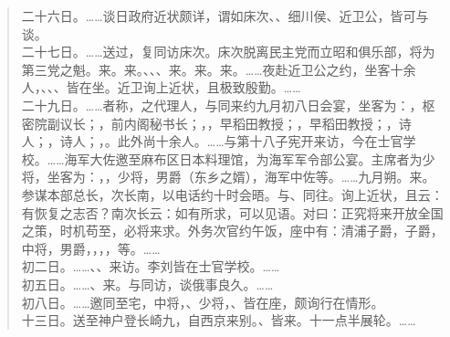 \begin{quote}
二十六日。……谈日政府近状颇详，谓如床次、、细川侯、近卫公，皆可与谈。\\

二十七日。……送过，复同访床次。床次脱离民主党而立昭和俱乐部，将为第三党之魁。来。来。、、、来。来。来。……夜赴近卫公之约，坐客十余人，、、、皆在坐。近卫询上近状，且极致殷勤。……\\

二十九日。……者称，之代理人，与同来约九月初八日会宴，坐客为：，枢密院副议长；，前内阁秘书长；，，早稻田教授；，早稻田教授；，诗人；，诗人；，。此外尚十余人。……与第十八子宪开来访，今在士官学校。……海军大佐邀至麻布区日本料理馆，为海军军令部公宴。主席者为少将，坐客为：，，少将，男爵（东乡之婿），海军中佐等。……九月朔。来。参谋本部总长，次长南，以电话约十时会晤。与、同往。询上近状，且云：有恢复之志否？南次长云：如有所求，可以见语。对曰：正究将来开放全国之策，时机苟至，必将来求。外务次官约午饭，座中有：清浦子爵，子爵，中将，男爵，，，，等。……\\

初二日。……、、来访。李刘皆在士官学校。……\\

初五日。……、来。与同访，谈俄事良久。……\\

初八日。……邀同至宅，中将，、少将，、皆在座，颇询行在情形。\\

十三日。送至神户登长崎九，自西京来别。、皆来。十一点半展轮。……\\
\end{quote}

